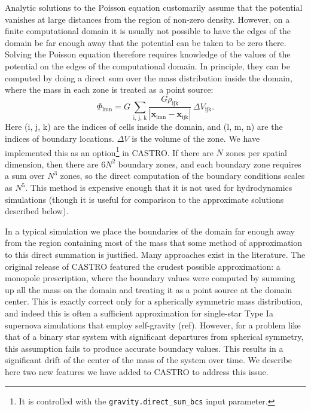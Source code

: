 \documentclass[12pt,preprint]{aastex}
\begin{document}
Analytic solutions to the Poisson equation customarily assume that the potential vanishes at large distances from the region of non-zero density. However, on a finite computational domain it is usually not possible to have the edges of the domain be far enough away that the potential can be taken to be zero there. Solving the Poisson equation therefore requires knowledge of the values of the potential on the edges of the computational domain. In principle, they can be computed by doing a direct sum over the mass distribution inside the domain, where the mass in each zone is treated as a point source:
\begin{equation}
  \Phi_{\text{lmn}} = G\, \sum_{\text{i, j, k}} \frac{G \rho_{\text{ijk}}}{|\mathbf{x}_{\text{lmn}} - \mathbf{x}_{\text{ijk}}|}\, \Delta V_{\text{ijk}}.\label{direct_sum}
\end{equation}
Here (i, j, k) are the indices of cells inside the domain, and (l, m, n) are the indices of boundary locations. $\Delta V$ is the volume of the zone. We have implemented this as an option\footnote{It is controlled with the \texttt{gravity.direct\_sum\_bcs} input parameter.} in CASTRO. If there are $N$ zones per spatial dimension, then there are $6 N^2$ boundary zones, and each boundary zone requires a sum over $N^3$ zones, so the direct computation of the boundary conditions scales as $N^5$.  This method is expensive enough that it is not used for hydrodynamics simulations (though it is useful for comparison to the approximate solutions described below).

In a typical simulation we place the boundaries of the domain far enough away from the region containing most of the mass that some method of approximation to this direct summation is justified. Many approaches exist in the literature. The original release of CASTRO featured the crudest possible approximation: a monopole prescription, where the boundary values were computed by summing up all the mass on the domain and treating it as a point source at the domain center. This is exactly correct only for a spherically symmetric mass distribution, and indeed this is often a sufficient approximation for single-star Type Ia supernova simulations that employ self-gravity (ref). However, for a problem like that of a binary star system with significant departures from spherical symmetry, this assumption fails to produce accurate boundary values. This results in a significant drift of the center of the mass of the system over time. We describe here two new features we have added to CASTRO to address this issue.
\end{document}
